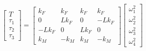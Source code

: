 \[
\begin{bmatrix}
    T \\
    \tau_1 \\
    \tau_2 \\
    \tau_3
\end{bmatrix} = 
\begin{bmatrix}
    k_F & k_F & k_F & k_F \\
    0 & Lk_F & 0 & -Lk_F \\
    -Lk_F & 0 & Lk_F & 0 \\
    k_M & -k_M & k_M & -k_M
\end{bmatrix}
\begin{bmatrix}
    \omega_1^2 \\
    \omega_2^2 \\
    \omega_3^2 \\
    \omega_4^2
\end{bmatrix}
\]







